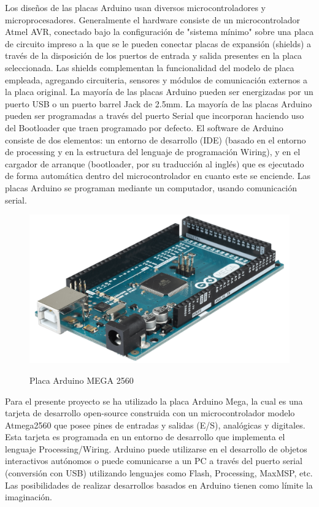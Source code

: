 Los diseños de las placas Arduino usan diversos microcontroladores y microprocesadores. Generalmente el hardware consiste de un microcontrolador Atmel AVR, conectado bajo la 
configuración de "sistema mínimo" sobre una placa de circuito impreso a la que se le pueden conectar placas de expansión (shields) a través de la disposición de los puertos de 
entrada y salida presentes en la placa seleccionada. Las shields complementan la funcionalidad del modelo de placa empleada, agregando circuiteria, sensores y módulos de 
comunicación externos a la placa original. La mayoría de las placas Arduino pueden ser energizadas por un puerto USB o un puerto barrel Jack de 2.5mm. La mayoría de las placas 
Arduino pueden ser programadas a través del puerto Serial que incorporan haciendo uso del Bootloader que traen programado por defecto. El software de Arduino consiste de dos 
elementos: un entorno de desarrollo (IDE) (basado en el entorno de processing y en la estructura del lenguaje de programación Wiring), y en el cargador de arranque (bootloader,
por su traducción al inglés) que es ejecutado de forma automática dentro del microcontrolador en cuanto este se enciende. Las placas Arduino se programan mediante un computador, 
usando comunicación serial.\\


\begin{figure}[H]
  \begin{center}
    \includegraphics[scale=0.07]{imagenes/arduino_mega.png}\\
    \caption{Placa Arduino MEGA 2560}
  \end{center}
\end{figure}


Para el presente proyecto se ha utilizado la placa Arduino Mega, la cual es una tarjeta de desarrollo open-source construida con un microcontrolador modelo Atmega2560 que posee 
pines de entradas y salidas (E/S), analógicas y digitales. Esta tarjeta es programada en un entorno de desarrollo que implementa el lenguaje Processing/Wiring. Arduino puede
utilizarse en el desarrollo de objetos interactivos autónomos o puede comunicarse a un PC a través del puerto serial (conversión con USB) utilizando lenguajes como Flash,
Processing, MaxMSP, etc. Las posibilidades de realizar desarrollos basados en Arduino tienen como límite la imaginación.\\

